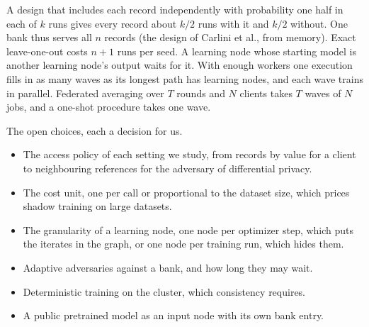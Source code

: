 \documentclass{labreport}
\begin{document}
A design that includes each record independently with probability one half in
each of $k$ runs gives every record about $k/2$ runs with it and $k/2$ without.
One bank thus serves all $n$ records (the design of Carlini et al., from
memory).
Exact leave-one-out costs $n+1$ runs per seed. A learning node whose starting
model is another learning node's output waits for it. With enough workers one
execution fills in as many waves as its longest path has learning nodes, and
each wave trains in parallel. Federated averaging over $T$ rounds and $N$ clients
takes $T$ waves of $N$ jobs, and a one-shot procedure takes one wave.

\lrnext
The open choices, each a decision for us.
\begin{itemize}
\item The access policy of each setting we study, from records by value for a
  client to neighbouring references for the adversary of differential privacy.
\item The cost unit, one per call or proportional to the dataset size, which
  prices shadow training on large datasets.
\item The granularity of a learning node, one node per optimizer step, which puts
  the iterates in the graph, or one node per training run, which hides them.
\item Adaptive adversaries against a bank, and how long they may wait.
\item Deterministic training on the cluster, which consistency requires.
\item A public pretrained model as an input node with its own bank entry.
\end{itemize}
\end{document}
